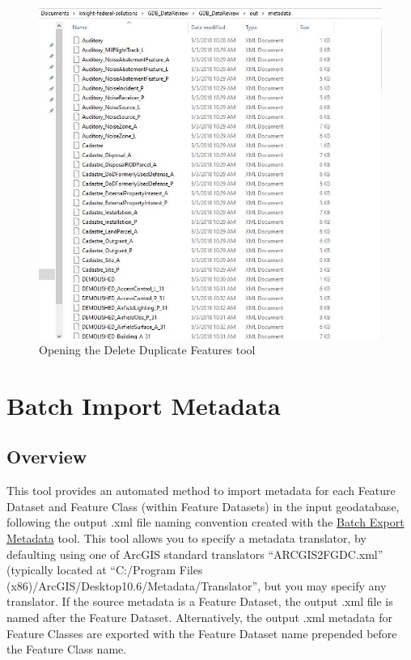 \documentclass[openany]{book}
\theoremstyle{definition}
\theoremstyle{definition}
\theoremstyle{definition}
\theoremstyle{remark}
\begin{document}
\begin{figure}[H]

{\centering \includegraphics{figures/exMeta-after} 

}

\caption{Opening the Delete Duplicate Features tool}\label{fig:exMetaafter}
\end{figure}

\hypertarget{imMeta}{\chapter{Batch Import Metadata}\label{imMeta}}

\section{Overview}\label{overview-10}

This tool provides an automated method to import metadata for each
Feature Dataset and Feature Class (within Feature Datasets) in the input
geodatabase, following the output .xml file naming convention created
with the \protect\hyperlink{exMeta}{Batch Export Metadata} tool. This
tool allows you to specify a metadata translator, by defaulting using
one of ArcGIS standard translators ``ARCGIS2FGDC.xml'' (typically
located at ``C:/Program Files
(x86)/ArcGIS/Desktop10.6/Metadata/Translator'', but you may specify any
translator. If the source metadata is a Feature Dataset, the output .xml
file is named after the Feature Dataset. Alternatively, the output .xml
metadata for Feature Classes are exported with the Feature Dataset name
prepended before the Feature Class name.
\end{document}

